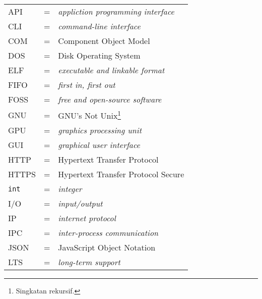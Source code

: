 \begin{longtable}{llp{3in}}
    API & \hspace{1.5cm} = & \textit{appliction programming interface}\\
    CLI & \hspace{1.5cm} = & \textit{command-line interface}\\
    COM & \hspace{1.5cm} = & Component Object Model\\
    DOS & \hspace{1.5cm} = & Disk Operating System\\
    ELF & \hspace{1.5cm} = & \textit{executable and linkable format}\\
    FIFO & \hspace{1.5cm} = & \textit{first in, first out}\\
    FOSS & \hspace{1.5cm} = & \textit{free and open-source software}\\
    GNU & \hspace{1.5cm} = & GNU's Not Unix\footnote{Singkatan rekursif.}\\
    GPU & \hspace{1.5cm} = & \textit{graphics processing unit}\\
    GUI & \hspace{1.5cm} = & \textit{graphical user interface}\\
    HTTP & \hspace{1.5cm} = & Hypertext Transfer Protocol\\
    HTTPS & \hspace{1.5cm} = & Hypertext Transfer Protocol Secure\\
    \verb|int| & \hspace{1.5cm} = & \textit{integer}\\
    I/O & \hspace{1.5cm} = & \textit{input/output}\\
    IP & \hspace{1.5cm} = & \textit{internet protocol}\\
    IPC & \hspace{1.5cm} = & \textit{inter-process communication}\\
    JSON & \hspace{1.5cm} = & JavaScript Object Notation\\
    LTS & \hspace{1.5cm} = & \textit{long-term support}\\

\end{longtable}
